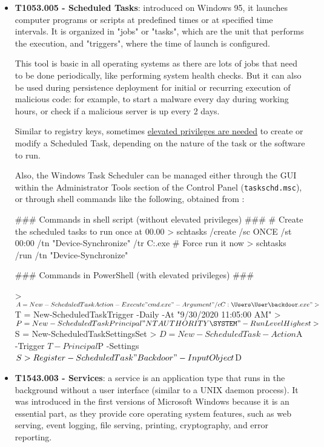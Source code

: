 \begin{itemize}
\pagebreak
\item \textbf{T1053.005 - Scheduled Tasks}: introduced on Windows 95, it launches computer programs or scripts at predefined times or at specified time intervals. It is organized in "jobs" or "tasks", which are the unit that performs the execution, and "triggers", where the time of launch is configured.

This tool is basic in all operating systems as there are lots of jobs that need to be done periodically, like performing system health checks. But it can also be used during persistence deployment for initial or recurring execution of malicious code: for example, to start a malware every day during working hours, or check if a malicious server is up every 2 days. 

Similar to registry keys, sometimes \underline{elevated privileges are needed} to create or modify a Scheduled Task, depending on the nature of the task or the software to run.

Also, the Windows Task Scheduler can be managed either through the GUI within the Administrator Tools section of the Control Panel (\texttt{taskschd.msc}), or through shell commands like the following, obtained from \cite{PayloadAllTheThings}:
\vspace{7pt}
\begin{spverbatim}
### Commands in shell script (without elevated privileges) ###
# Create the scheduled tasks to run once at 00.00
> schtasks /create /sc ONCE /st 00:00 /tn "Device-Synchronize" /tr C:\Temp\backdoor.exe
# Force run it now 
> schtasks /run /tn "Device-Synchronize"

### Commands in PowerShell (with elevated privileges) ###

> $A = New-ScheduledTaskAction -Execute "cmd.exe" -Argument "/c C:\Users\User\backdoor.exe"
> $T = New-ScheduledTaskTrigger -Daily -At "9/30/2020 11:05:00 AM"
> $P = New-ScheduledTaskPrincipal "NT AUTHORITY\SYSTEM" -RunLevel Highest
> $S = New-ScheduledTaskSettingsSet
> $D = New-ScheduledTask -Action $A -Trigger $T -Principal $P -Settings $S
> Register-ScheduledTask "Backdoor" -InputObject $D
\end{spverbatim}%

\pagebreak
\item \textbf{T1543.003 - Services}: a service\cite{WindowsServices} is an application type that runs in the background without a user interface (similar to a UNIX daemon process). It was introduced in the first versions of Microsoft Windows because it is an essential part, as they provide core operating system features, such as web serving, event logging, file serving, printing, cryptography, and error reporting.


\end{itemize}
